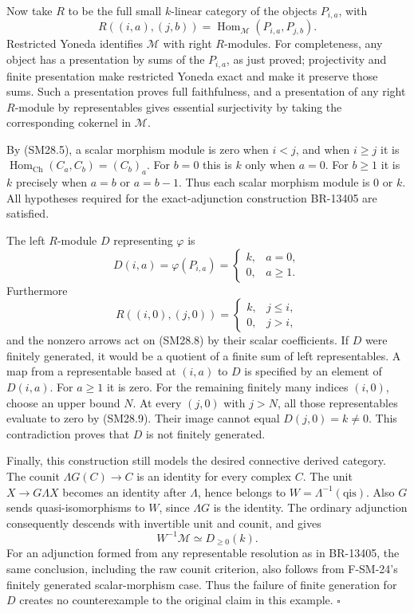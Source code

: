 Now take \(R\) to be the full small \(k\)-linear category of the
objects \(P_{i,a}\), with
\[
 R((i,a),(j,b))=
 \operatorname{Hom}_{\mathcal M}(P_{i,a},P_{j,b}).
\]
Restricted Yoneda identifies \(\mathcal M\) with right \(R\)-modules.
For completeness, any object has a presentation by sums of the
\(P_{i,a}\), as just proved; projectivity and finite presentation make
restricted Yoneda exact and make it preserve those sums.  Such a
presentation proves full faithfulness, and a presentation of any
right \(R\)-module by representables gives essential surjectivity
by taking the corresponding cokernel in \(\mathcal M\).

By (SM28.5), a scalar morphism module is zero when \(i<j\), and
when \(i\ge j\) it is
\(\operatorname{Hom}_{\mathrm{Ch}}(C_a,C_b)=(C_b)_a\).
For \(b=0\) this is \(k\) only when \(a=0\).
For \(b\ge1\) it is \(k\) precisely when \(a=b\) or \(a=b-1\).
Thus each scalar morphism module is \(0\) or \(k\).
All hypotheses required for the exact-adjunction construction
BR-13405 are satisfied.

The left \(R\)-module \(D\) representing \(\varphi\) is
\[
 D(i,a)=\varphi(P_{i,a})=
 \begin{cases}k,&a=0,\\0,&a\ge1.\end{cases}
 \tag{SM28.8}
\]
Furthermore
\[
 R((i,0),(j,0))=
 \begin{cases}k,&j\le i,\\0,&j>i,\end{cases}
 \tag{SM28.9}
\]
and the nonzero arrows act on (SM28.8) by their scalar coefficients.
If \(D\) were finitely generated, it would be a quotient of a finite
sum of left representables.  A map from a representable based at
\((i,a)\) to \(D\) is specified by an element of \(D(i,a)\).
For \(a\ge1\) it is zero.  For the remaining finitely many indices
\((i,0)\), choose an upper bound \(N\).  At every \((j,0)\) with
\(j>N\), all those representables evaluate to zero by (SM28.9).
Their image cannot equal \(D(j,0)=k\ne0\).
This contradiction proves that \(D\) is not finitely generated.

Finally, this construction still models the desired connective
derived category.  The counit
\(\Lambda G(C)\to C\) is an identity for every complex \(C\).
The unit \(X\to G\Lambda X\) becomes an identity after \(\Lambda\),
hence belongs to \(W=\Lambda^{-1}(\mathrm{qis})\).
Also \(G\) sends quasi-isomorphisms to \(W\), since \(\Lambda G\)
is the identity.  The ordinary adjunction consequently descends
with invertible unit and counit, and gives
\[
 W^{-1}\mathcal M\simeq D_{\ge0}(k).
\]
For an adjunction formed from any representable resolution as in
BR-13405, the same conclusion, including the raw counit criterion,
also follows from F-SM-24's finitely generated scalar-morphism case.
Thus the failure of finite generation for \(D\) creates no
counterexample to the original claim in this example. \(\square\)

